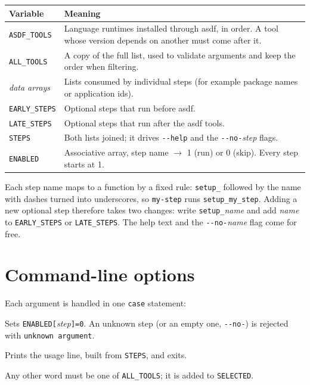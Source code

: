 \documentclass[11pt,a4paper]{article}
\newcommand{\cmd}[1]{\texttt{#1}}
\begin{document}
\begin{center}
\begin{tabularx}{\linewidth}{@{}lX@{}}
\toprule
Variable & Meaning \\
\midrule
\cmd{ASDF\_TOOLS} & Language runtimes installed through asdf, in order. A tool whose version depends on another must come after it. \\
\cmd{ALL\_TOOLS} & A copy of the full list, used to validate arguments and keep the order when filtering. \\
\textit{data arrays} & Lists consumed by individual steps (for example package names or application ids). \\
\cmd{EARLY\_STEPS} & Optional steps that run before asdf. \\
\cmd{LATE\_STEPS} & Optional steps that run after the asdf tools. \\
\cmd{STEPS} & Both lists joined; it drives \cmd{-{}-help} and the \cmd{-{}-no-}\textit{step} flags. \\
\cmd{ENABLED} & Associative array, step name $\to$ 1 (run) or 0 (skip). Every step starts at 1. \\
\bottomrule
\end{tabularx}
\end{center}

\noindent Each step name maps to a function by a fixed rule: \cmd{setup\_} followed by the
name with dashes turned into underscores, so \cmd{my-step} runs \cmd{setup\_my\_step}.
Adding a new optional step therefore takes two changes: write \cmd{setup\_}\textit{name}
and add \textit{name} to \cmd{EARLY\_STEPS} or \cmd{LATE\_STEPS}. The help text and the
\cmd{-{}-no-}\textit{name} flag come for free.

\section{Command-line options}

Each argument is handled in one \cmd{case} statement:

\begin{description}[style=nextline]
\item[\cmd{-{}-no-}\textit{step}] Sets \cmd{ENABLED[}\textit{step}\cmd{]=0}. An unknown step
  (or an empty one, \cmd{-{}-no-}) is rejected with \cmd{unknown argument}.
\item[\cmd{-h}, \cmd{-{}-help}] Prints the usage line, built from \cmd{STEPS}, and exits.
\item[\textit{tool}] Any other word must be one of \cmd{ALL\_TOOLS}; it is added to \cmd{SELECTED}.
\end{description}
\end{document}
